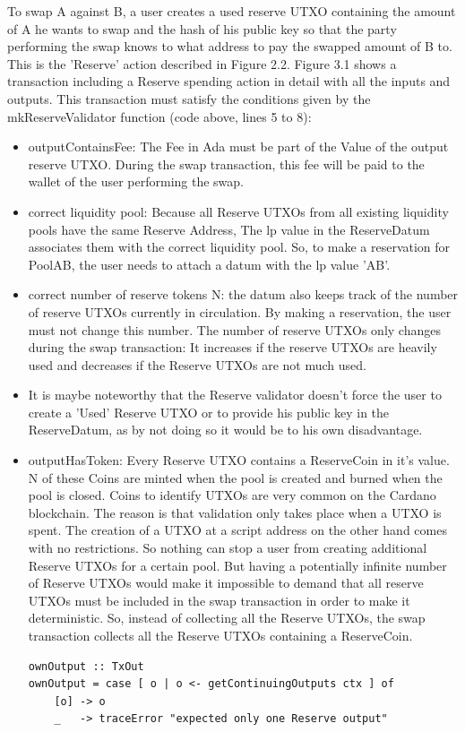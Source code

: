 \documentclass[a4paper,twoside,12pt]{report}
\begin{document}
To swap A against B, a user creates a used reserve UTXO containing the amount of A he wants to swap and the hash of his public key so that the party performing the swap knows to what address to pay the swapped amount of B to. This is the 'Reserve' action described in Figure 2.2. Figure 3.1 shows a transaction including a Reserve spending action in detail with all the inputs and outputs. This transaction must satisfy the conditions given by the mkReserveValidator function (code above, lines 5 to 8):

\begin{itemize}
\item outputContainsFee: The Fee in Ada must be part of the Value of the output reserve UTXO. During the swap transaction, this fee will be paid to the wallet of the user performing the swap.
\item correct liquidity pool: Because all Reserve UTXOs from all existing liquidity pools have the same Reserve Address, The lp value in the ReserveDatum associates them with the correct liquidity pool. So, to make a reservation for PoolAB, the user needs to attach a datum with the lp value 'AB'.
\item correct number of reserve tokens N: the datum also keeps track of the number of reserve UTXOs currently in circulation. By making a reservation, the user must not change this number. The number of reserve UTXOs only changes during the swap transaction: It increases if the reserve UTXOs are heavily used and decreases if the Reserve UTXOs are not much used.
\item It is maybe noteworthy that the Reserve validator doesn't force the user to create a 'Used' Reserve UTXO or to provide his public key in the ReserveDatum, as by not doing so it would be to his own disadvantage. 
\item outputHasToken: Every Reserve UTXO contains a ReserveCoin in it's value. N of these Coins are minted when the pool is created and burned when the pool is closed. Coins to identify UTXOs are very common on the Cardano blockchain. The reason is that validation only takes place when a UTXO is spent. The creation of a UTXO at a script address on the other hand comes with no restrictions. So nothing can stop a user from creating additional Reserve UTXOs for a certain pool. But having a potentially infinite number of Reserve UTXOs would make it impossible to demand that all reserve UTXOs must be included in the swap transaction in order to make it deterministic. So, instead of collecting all the Reserve UTXOs, the swap transaction collects all the Reserve UTXOs containing a ReserveCoin.
\begin{verbatim}
ownOutput :: TxOut
ownOutput = case [ o | o <- getContinuingOutputs ctx ] of
    [o] -> o
    _   -> traceError "expected only one Reserve output"


\end{verbatim}
\end{itemize}
\end{document}
